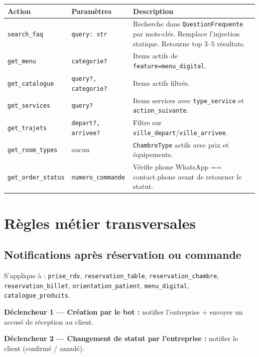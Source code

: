 \documentclass[11pt,a4paper]{article}
\newcommand{\slug}[1]{\texttt{\color{AGTDark}#1}}
\begin{document}
\begin{center}
\begin{tabularx}{\textwidth}{llX}
\toprule
\textbf{Action} & \textbf{Paramètres} & \textbf{Description} \\
\midrule
\slug{search\_faq} & \texttt{query: str} & Recherche dans \slug{QuestionFrequente} par mots-clés. Remplace l'injection statique. Retourne top 3--5 résultats. \\[4pt]
\slug{get\_menu} & \texttt{categorie?} & Items actifs de \texttt{feature=menu\_digital}. \\[4pt]
\slug{get\_catalogue} & \texttt{query?, categorie?} & Items actifs filtrés. \\[4pt]
\slug{get\_services} & \texttt{query?} & Items services avec \texttt{type\_service} et \texttt{action\_suivante}. \\[4pt]
\slug{get\_trajets} & \texttt{depart?, arrivee?} & Filtre sur \texttt{ville\_depart}/\texttt{ville\_arrivee}. \\[4pt]
\slug{get\_room\_types} & aucun & \slug{ChambreType} actifs avec prix et équipements. \\[4pt]
\slug{get\_order\_status} & \texttt{numero\_commande} & Vérifie phone WhatsApp == contact.phone avant de retourner le statut. \\
\bottomrule
\end{tabularx}
\end{center}

\section{Règles métier transversales}

\subsection{Notifications après réservation ou commande}

S'applique à : \slug{prise\_rdv}, \slug{reservation\_table}, \slug{reservation\_chambre},
\slug{reservation\_billet}, \slug{orientation\_patient}, \slug{menu\_digital},
\slug{catalogue\_produits}.

\textbf{Déclencheur 1 — Création par le bot :} notifier l'entreprise + envoyer
un accusé de réception au client.

\textbf{Déclencheur 2 — Changement de statut par l'entreprise :} notifier le client
(confirmé / annulé).
\end{document}
